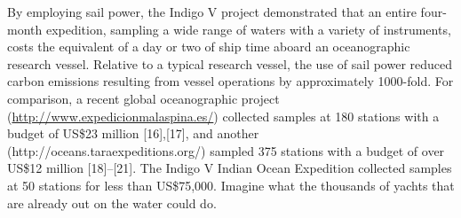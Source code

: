 By employing sail power, the Indigo V project demonstrated that an entire four-month expedition, sampling a wide range of waters with a variety of instruments, costs the equivalent of a day or two of ship time aboard an oceanographic research vessel. Relative to a typical research vessel, the use of sail power reduced carbon emissions resulting from vessel operations by approximately 1000-fold. For comparison, a recent global oceanographic project (\url{http://www.expedicionmalaspina.es/}) collected samples at 180 stations with a budget of US\$23 million [16],[17], and another (http://oceans.taraexpeditions.org/) sampled 375 stations with a budget of over US\$12 million [18]–[21]. The Indigo V Indian Ocean Expedition collected samples at 50 stations for less than US\$75,000. Imagine what the thousands of yachts that are already out on the water could do.